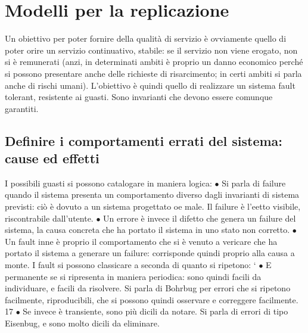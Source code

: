 \section{Modelli per la replicazione}
Un obiettivo per poter fornire della qualità di servizio è ovviamente quello di
poter orire un servizio continuativo, stabile: se il servizio non viene erogato,
non si è remunerati (anzi, in determinati ambiti è proprio un danno economico
perché si possono presentare anche delle richieste di risarcimento; in certi ambiti
si parla anche di rischi umani). L'obiettivo è quindi quello di realizzare un
sistema fault tolerant, resistente ai guasti. Sono invarianti che devono essere
comunque garantiti.
\subsection{Definire i comportamenti errati del sistema: cause ed effetti}
I possibili guasti si possono catalogare in maniera logica:
$\bullet$ Si parla di failure quando il sistema presenta un comportamento diverso
dagli invarianti di sistema previsti: ciò è dovuto a un sistema progettato
oe
male. Il failure è l'eetto visibile, riscontrabile dall'utente.
$\bullet$ Un errore è invece il difetto che genera un failure del sistema, la causa
concreta che ha portato il sistema in uno stato non corretto.
$\bullet$ Un fault inne è proprio il comportamento che si è venuto a vericare che
ha portato il sistema a generare un failure: corrisponde quindi proprio alla
causa a monte.
I fault si possono classicare a seconda di quanto si ripetono:
`
$\bullet$ E permanente se si ripresenta in maniera periodica: sono quindi facili
da individuare, e facili da risolvere. Si parla di Bohrbug per errori che
si ripetono facilmente, riproducibili, che si possono quindi osservare e
correggere facilmente.
17
$\bullet$ Se invece è transiente, sono più dicili da notare. Si parla di errori di tipo
Eisenbug, e sono molto dicili da eliminare.

